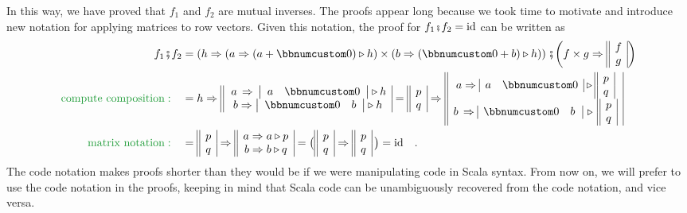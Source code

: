 In this way, we have proved that $f_{1}$ and $f_{2}$ are mutual
inverses. The proofs appear long because we took time to motivate
and introduce new notation for applying matrices to row vectors. Given
this notation, the proof for $f_{1}\bef f_{2}=\text{id}$ can be written
as
\begin{align*}
f_{1}\bef f_{2} & =\left(h\Rightarrow(a\Rightarrow(a+\bbnum 0)\triangleright h)\times(b\Rightarrow(\bbnum 0+b)\triangleright h)\right)\bef\bigg(f\times g\Rightarrow\begin{array}{||c|}
f\\
g
\end{array}\bigg)\\
{\color{greenunder}\text{compute composition}:}\quad & =h\Rightarrow\begin{array}{||c|}
\,a\,\Rightarrow\,\left|\begin{array}{cc}
a & \bbnum 0\end{array}\right|\triangleright h\\
b\Rightarrow\left|\begin{array}{cc}
\bbnum 0 & b\end{array}\right|\triangleright h
\end{array}=\begin{array}{||c|}
p\\
q
\end{array}\Rightarrow\begin{array}{||c|}
a\Rightarrow\begin{array}{|cc|}
a & \bbnum 0\end{array}\triangleright\begin{array}{||c|}
p\\
q
\end{array}\\
b\,\Rightarrow\begin{array}{|cc|}
\bbnum 0 & b\,\end{array}\,\triangleright\,\begin{array}{||c|}
p\\
q
\end{array}
\end{array}\\
{\color{greenunder}\text{matrix notation}:}\quad & =\begin{array}{||c|}
p\\
q
\end{array}\Rightarrow\begin{array}{||c|}
a\Rightarrow a\triangleright p\\
b\Rightarrow b\triangleright q
\end{array}=\big(\begin{array}{||c|}
p\\
q
\end{array}\Rightarrow\begin{array}{||c|}
p\\
q
\end{array}\,\big)=\text{id}\quad.
\end{align*}
The code notation makes proofs shorter than they would be if we were
manipulating code in Scala syntax. From now on, we will prefer to
use the code notation in the proofs, keeping in mind that Scala code
can be unambiguously recovered from the code notation, and vice versa.


